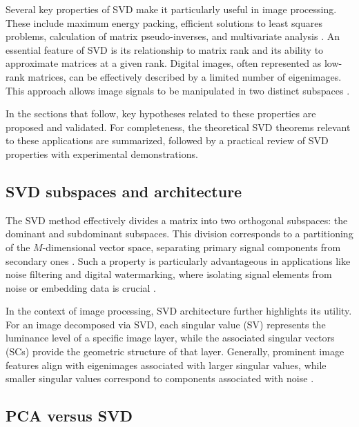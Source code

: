 \documentclass[
  journal,
]{IEEEtran}%
\begin{document}
Several key properties of SVD make it particularly useful in image
processing. These include maximum energy packing, efficient solutions to
least squares problems, calculation of matrix pseudo-inverses, and
multivariate analysis . An
essential feature of SVD is its relationship to matrix rank and its
ability to approximate matrices at a given rank. Digital images, often
represented as low-rank matrices, can be effectively described by a
limited number of eigenimages. This approach allows image signals to be
manipulated in two distinct subspaces
.

In the sections that follow, key hypotheses related to these properties
are proposed and validated. For completeness, the theoretical SVD
theorems relevant to these applications are summarized, followed by a
practical review of SVD properties with experimental demonstrations.

\subsection{SVD subspaces and
architecture}\label{svd-subspaces-and-architecture}

The SVD method effectively divides a matrix into two orthogonal
subspaces: the dominant and subdominant subspaces. This division
corresponds to a partitioning of the \(M\)-dimensional vector space,
separating primary signal components from secondary ones
. Such a property is particularly
advantageous in applications like noise filtering and digital
watermarking, where isolating signal elements from noise or embedding
data is crucial .

In the context of image processing, SVD architecture further highlights
its utility. For an image decomposed via SVD, each singular value (SV)
represents the luminance level of a specific image layer, while the
associated singular vectors (SCs) provide the geometric structure of
that layer. Generally, prominent image features align with eigenimages
associated with larger singular values, while smaller singular values
correspond to components associated with noise
.

\subsection{PCA versus SVD}\label{pca-versus-svd}
\end{document}
